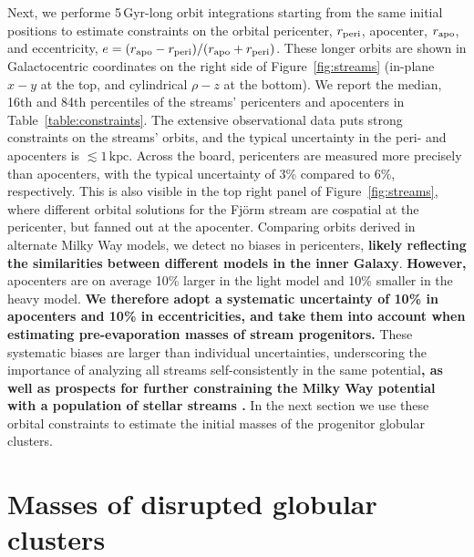 \documentclass[twocolumn]{aastex63}
\newcommand{\kpc}{\ensuremath{\textrm{kpc}}}
\newcommand{\changes}[1]{{\textbf{#1}}}
\begin{document}
Next, we performe 5\,Gyr-long orbit integrations starting from the same initial positions to estimate constraints on the orbital pericenter, $r_{\rm peri}$, apocenter, $r_{\rm apo}$, and eccentricity, $e=(r_{\rm apo} - r_{\rm peri})/(r_{\rm apo} + r_{\rm peri})$.
These longer orbits are shown in Galactocentric coordinates on the right side of Figure~\ref{fig:streams} (in-plane $x-y$ at the top, and cylindrical $\rho-z$ at the bottom).
We report the median, 16th and 84th percentiles of the streams' pericenters and apocenters in Table~\ref{table:constraints}.
The extensive observational data puts strong constraints on the streams' orbits, and the typical uncertainty in the peri- and apocenters is $\lesssim1\,\kpc$.
Across the board, pericenters are measured more precisely than apocenters, with the typical uncertainty of 3\% compared to 6\%, respectively.
This is also visible in the top right panel of Figure~\ref{fig:streams}, where different orbital solutions for the  Fj\" orm stream are cospatial at the pericenter, but fanned out at the apocenter.
Comparing orbits derived in alternate Milky Way models, we detect no biases in pericenters, \changes{likely reflecting the similarities between different models in the inner Galaxy}.
\changes{However,} apocenters are on average 10\% larger in the light model and 10\% smaller in the heavy model.
\changes{We therefore adopt a systematic uncertainty of 10\% in apocenters and 10\% in eccentricities, and take them into account when estimating pre-evaporation masses of stream progenitors.}
These systematic biases are larger than individual uncertainties, underscoring the importance of analyzing all streams self-consistently in the same potential\changes{, as well as prospects for further constraining the Milky Way potential with a population of stellar streams \citep[e.g.,][]{bh:2018}.}
In the next section we use these orbital constraints to estimate the initial masses of the progenitor globular clusters.

\section{Masses of disrupted globular clusters}
\label{sec:disrupted}
\end{document}
